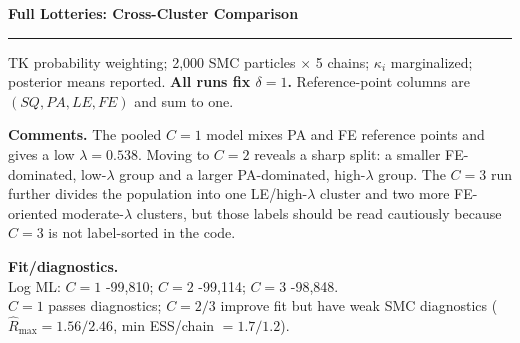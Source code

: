 \documentclass[10pt]{article}
\newcommand{\slidetitle}[1]{%
  {\Large\bfseries #1}\par\vspace{0.20em}
  \textcolor{black!35}{\rule{\textwidth}{0.45pt}}\vspace{0.25em}
}
\begin{document}
\slidetitle{Full Lotteries: Cross-Cluster Comparison}

{\scriptsize
TK probability weighting; 2,000 SMC particles $\times$ 5 chains; $\kappa_i$
marginalized; posterior means reported. \textbf{All runs fix $\delta=1$.}
Reference-point columns are $(SQ, PA, LE, FE)$ and sum to one.
}

\vspace{0.20em}
\centering
{}

\vspace{0.35em}
\begin{minipage}[t]{0.72\textwidth}
\scriptsize
\textbf{Comments.}
The pooled $C=1$ model mixes PA and FE reference points and gives a low
$\lambda=0.538$. Moving to $C=2$ reveals a sharp split: a smaller FE-dominated,
low-$\lambda$ group and a larger PA-dominated, high-$\lambda$ group. The $C=3$
run further divides the population into one LE/high-$\lambda$ cluster and two
more FE-oriented moderate-$\lambda$ clusters, but those labels should be read
cautiously because $C=3$ is not label-sorted in the code.
\end{minipage}
\hfill
\begin{minipage}[t]{0.25\textwidth}
\scriptsize
\textbf{Fit/diagnostics.}\\
Log ML: $C=1$ -99,810; $C=2$ -99,114; $C=3$ -98,848.\\
$C=1$ passes diagnostics; $C=2/3$ improve fit but have weak SMC diagnostics
($\hat R_{\max}=1.56/2.46$, min ESS/chain $=1.7/1.2$).
\end{minipage}
\end{document}
